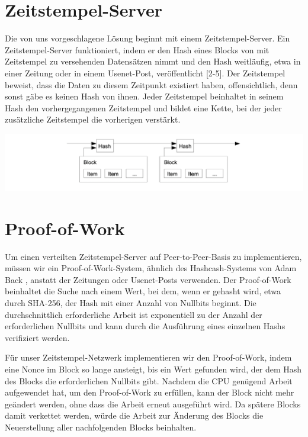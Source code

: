\documentclass[9pt]{article}
\begin{document}
	\section{Zeitstempel-Server}
	
	Die von uns vorgeschlagene Lösung beginnt mit einem Zeitstempel-Server. Ein Zeitstempel-Server funktioniert, indem er den Hash eines Blocks von mit Zeitstempel zu versehenden Datensätzen nimmt und den Hash weitläufig, etwa in einer Zeitung oder in einem Usenet-Post, veröffentlicht [2-5]. Der Zeitstempel beweist, dass die Daten zu diesem Zeitpunkt existiert haben, offensichtlich, denn sonst gäbe es keinen Hash von ihnen. Jeder Zeitstempel beinhaltet in seinem Hash den vorhergegangenen Zeitstempel und bildet eine Kette, bei der jeder zusätzliche Zeitstempel die vorherigen verstärkt.
	
	\begin{center}
		\includegraphics[scale=0.35]{pics/timestampserver.png}
	\end{center}

	\newpage
	
	\section{Proof-of-Work}
	
	Um einen verteilten Zeitstempel-Server auf Peer-to-Peer-Basis zu implementieren, müssen wir ein Proof-of-Work-System, ähnlich des Hashcash-Systems von Adam Back \cite{back}, anstatt der Zeitungen oder Usenet-Posts verwenden. Der Proof-of-Work beinhaltet die Suche nach einem Wert, bei dem, wenn er gehasht wird, etwa durch SHA-256, der Hash mit einer Anzahl von Nullbits beginnt. Die durchschnittlich erforderliche Arbeit ist exponentiell zu der Anzahl der erforderlichen Nullbits und kann durch die Ausführung eines einzelnen Hashs verifiziert werden.

	Für unser Zeitstempel-Netzwerk implementieren wir den Proof-of-Work, indem eine Nonce im Block so lange ansteigt, bis ein Wert gefunden wird, der dem Hash des Blocks die erforderlichen Nullbits gibt. Nachdem die CPU genügend Arbeit aufgewendet hat, um den Proof-of-Work zu erfüllen, kann der Block nicht mehr geändert werden, ohne dass die Arbeit erneut ausgeführt wird. Da spätere Blocks damit verkettet werden, würde die Arbeit zur Änderung des Blocks die Neuerstellung aller nachfolgenden Blocks beinhalten.
	
\end{document}
